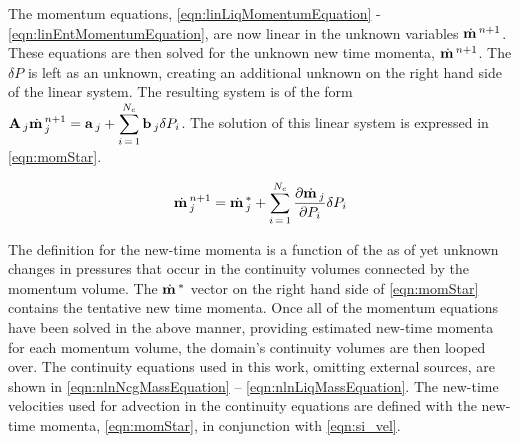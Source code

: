 The momentum equations, \eqref{eqn:linLiqMomentumEquation} - \eqref{eqn:linEntMomentumEquation}, are now linear in the unknown variables $\momVec{}^{n+1}$.
These equations are then solved for the unknown new time momenta, $\momVec{}^{n+1}$.
The $\delta P$ is left as an unknown, creating an additional unknown on the right hand side of the linear system.
The resulting system is of the form $\displaystyle \vec{A}_{j} \momVec{}_{j}^{n+1} = \vec{a}_{j} + \sum^{N_{c}}_{i\,=\,1} \vec{b}_{j} \delta P_{i}$.
The solution of this linear system is expressed in \eqref{eqn:momStar}.

\begin{equation}
\label{eqn:momStar}
\momVec{}_{j}^{n+1} = \momVec{}^{*}_{j} + \sum^{N_{c}}_{i\,=\,1} \frac{\partial \momVec{}_{j}}{\partial P_{i}} \delta P_{i}
\end{equation}

The definition for the new-time momenta is a function of the as of yet unknown changes in pressures that occur in the continuity volumes connected by the momentum volume.
The $\momVec{}^{*}$ vector on the right hand side of \eqref{eqn:momStar} contains the tentative new time momenta.
Once all of the momentum equations have been solved in the above manner, providing estimated new-time momenta for each momentum volume, the domain's continuity volumes are then looped over.
The continuity equations used in this work, omitting external sources, are shown in \eqref{eqn:nlnNcgMassEquation} -- \eqref{eqn:nlnLiqMassEquation}. 
The new-time velocities used for advection in the continuity equations are defined with the new-time momenta, \eqref{eqn:momStar}, in conjunction with \eqref{eqn:si_vel}.

